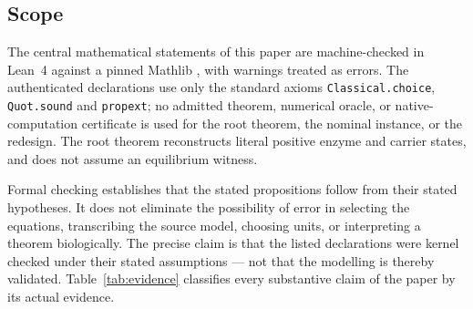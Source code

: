 \documentclass[11pt,a4paper]{article}
\theoremstyle{plain}
\theoremstyle{definition}
\theoremstyle{remark}
\begin{document}
\subsection{Scope}

The central mathematical statements of this paper are machine-checked in
Lean~4 \citep{moura2021} against a pinned Mathlib \citep{mathlib2020}, with
warnings treated as errors. The authenticated declarations use only the standard
axioms \texttt{Classical.choice}, \texttt{Quot.sound} and \texttt{propext}; no
admitted theorem, numerical oracle, or native-computation certificate is used for
the root theorem, the nominal instance, or the redesign. The root theorem
reconstructs literal positive enzyme and carrier states, and does not assume an
equilibrium witness.

Formal checking establishes that the stated propositions follow from their stated
hypotheses. It does not eliminate the possibility of error in selecting the
equations, transcribing the source model, choosing units, or interpreting a
theorem biologically. The precise claim is that the listed declarations were kernel
checked under their stated assumptions --- not that the modelling is thereby
validated. Table~\ref{tab:evidence} classifies every substantive claim of the paper
by its actual evidence.
\end{document}
